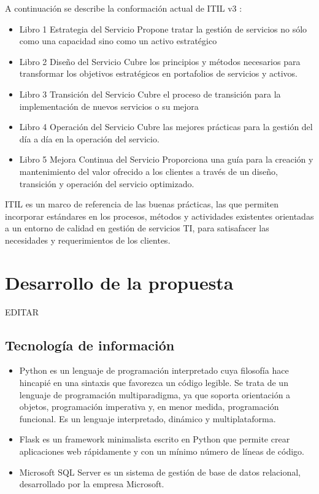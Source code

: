 \documentclass[preprint,12pt]{elsarticle}
\begin{document}
A continuación se describe la conformación actual de ITIL v3 :
\begin{itemize}
\item Libro 1  Estrategia del Servicio 
Propone tratar la gestión de servicios no sólo como una capacidad sino como un activo estratégico
\item Libro 2 Diseño del Servicio
Cubre los principios y métodos necesarios para transformar los objetivos estratégicos en portafolios de servicios y activos.
\item Libro 3 Transición del Servicio
Cubre el proceso de transición para la implementación de nuevos servicios o su mejora
\item Libro 4 Operación del Servicio
Cubre las mejores prácticas para la gestión del día a día en la operación del servicio.
\item Libro 5 Mejora Continua del Servicio
Proporciona una guía para la creación y mantenimiento del valor ofrecido a los clientes a través de un diseño, transición y operación del servicio optimizado.
\end{itemize}
ITIL es un marco de referencia de las buenas prácticas, las que permiten incorporar estándares en los procesos, métodos y actividades existentes orientadas a un entorno de calidad en gestión de servicios TI, para satisafacer las necesidades y requerimientos de los clientes.




\section{Desarrollo de la propuesta}

EDITAR\\


\subsection{\textbf{Tecnología de información}}

\begin{itemize}
\item Python es un lenguaje de programación interpretado cuya filosofía hace hincapié en una sintaxis que favorezca un código legible. Se trata de un lenguaje de programación multiparadigma, ya que soporta orientación a objetos, programación imperativa y, en menor medida, programación funcional. Es un lenguaje interpretado, dinámico y multiplataforma.

\item Flask es un framework minimalista escrito en Python que permite crear aplicaciones web rápidamente y con un mínimo número de líneas de código.

\item Microsoft SQL Server es un sistema de gestión de base de datos relacional, desarrollado por la empresa Microsoft.
\end{itemize}
\end{document}
